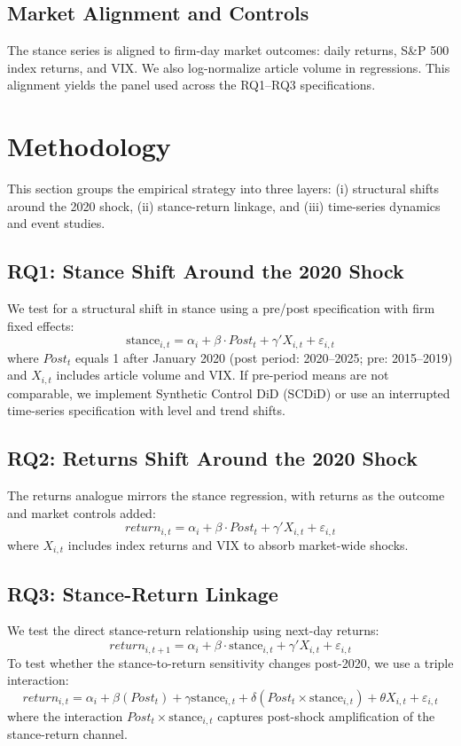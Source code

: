 \documentclass[conference]{IEEEtran}
\begin{document}
\subsection{Market Alignment and Controls}
The stance series is aligned to firm-day market outcomes: daily returns, S\&P 500 index returns, and VIX. We also log-normalize article volume in regressions. This alignment yields the panel used across the RQ1--RQ3 specifications.

\section{Methodology}
This section groups the empirical strategy into three layers: (i) structural shifts around the 2020 shock, (ii) stance-return linkage, and (iii) time-series dynamics and event studies.

\subsection{RQ1: Stance Shift Around the 2020 Shock}
We test for a structural shift in stance using a pre/post specification with firm fixed effects:
\begin{equation}
\text{stance}_{i,t} = \alpha_i + \beta \cdot Post_t + \gamma' X_{i,t} + \varepsilon_{i,t}
\end{equation}
where $Post_t$ equals 1 after January 2020 (post period: 2020--2025; pre: 2015--2019) and $X_{i,t}$ includes article volume and VIX. If pre-period means are not comparable, we implement Synthetic Control DiD (SCDiD) or use an interrupted time-series specification with level and trend shifts.

\subsection{RQ2: Returns Shift Around the 2020 Shock}
The returns analogue mirrors the stance regression, with returns as the outcome and market controls added:
\begin{equation}
return_{i,t} = \alpha_i + \beta \cdot Post_t + \gamma' X_{i,t} + \varepsilon_{i,t}
\end{equation}
where $X_{i,t}$ includes index returns and VIX to absorb market-wide shocks.

\subsection{RQ3: Stance-Return Linkage}
We test the direct stance-return relationship using next-day returns:
\begin{equation}
return_{i,t+1} = \alpha_i + \beta \cdot \text{stance}_{i,t} + \gamma' X_{i,t} + \varepsilon_{i,t}
\end{equation}
To test whether the stance-to-return sensitivity changes post-2020, we use a triple interaction:
\begin{equation}
return_{i,t} = \alpha_i + \beta (Post_t) + \gamma \text{stance}_{i,t} + \delta (Post_t \times \text{stance}_{i,t}) + \theta X_{i,t} + \varepsilon_{i,t}
\end{equation}
where the interaction $Post_t \times \text{stance}_{i,t}$ captures post-shock amplification of the stance-return channel.
\end{document}
